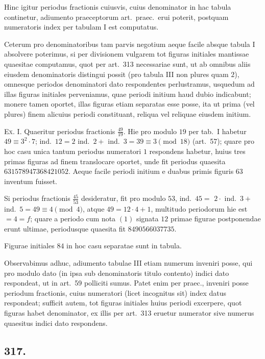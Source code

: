 \documentclass[12pt,a4paper]{article}
\theoremstyle{plain}
\theoremstyle{definition}
\theoremstyle{remark}
\begin{document}
Hinc igitur periodus fractionis cuiusvis, cuius denominator in hac tabula
continetur, adiumento praeceptorum art.\ praec.\ erui poterit, postquam numeratoris
index per tabulam I est computatus.

Ceterum pro denominatoribus tam parvis negotium aeque facile absque
tabula I absolvere poterimus, si per divisionem vulgarem tot figuras initiales
mantissae quaesitae computamus, quot per art.\@~313 necessariae sunt, ut ab
omnibus aliis eiusdem denominatoris distingui possit (pro tabula III non plures
quam $2$), omnesque periodos denominatori dato respondentes perlustramus,
usquedum ad illas figuras initiales perveniamus, quae periodi initium haud dubio
indicabunt; monere tamen oportet, illas figuras etiam separatas esse posse, ita
ut prima (vel plures) finem alicuius periodi constituant, reliqua vel reliquae
eiusdem initium.

\textsc{Ex. I.} Quaeritur periodus fractionis $\tfrac{49}{19}$. Hie pro modulo $19$ per tab.\ I
habetur $49 \equiv 3^2 \cdot 7$; ind.\ $12 = 2$ ind.\ $2 + $ ind.\ $3 = 39 \equiv 3 \pmod{18}$
(art.\@~57); quare pro hoc casu unica tantum periodus numeratori $1$
respondens habetur, huius tres primas figuras ad finem translocare oportet,
unde fit periodus quaesita $631578947368421052$.
Aeque facile periodi initium e duabus primis figuris $63$ inventum fuisset.

Si periodus fractionis $\tfrac{45}{53}$ desideratur, fit pro modulo $53$, ind.\ $45 = $
$2 \cdot $ ind.\ $3 + $ ind.\ $5 = 49 \equiv 4 \pmod{4}$, atque $49 = 12 \cdot 4 + 1$,
multitudo periodorum hie est $= 4 = f$; quare a periodo cum nota $(1)$
signata $12$ primae figurae postponendae erunt ultimae, periodusque quaesita fit
$8490566037735$.

Figurae initiales $84$ in hoc casu separatae sunt in tabula.

Observabimus adhuc, adiumento tabulae III etiam numerum inveniri posse,
qui pro modulo dato (in ipsa sub denominatoris titulo contento) indici dato
respondeat, ut in art.\@~59 polliciti sumus. Patet enim per praec., inveniri
posse periodum fractionis, cuius numeratori (licet incognitus sit) index datus
respondeat; sufficit autem, tot figuras initiales huius periodi excerpere, quot
figuras habet denominator, ex illis per art.\@~313 eruetur numerator sive numerus
quaesitus indici dato respondens.

\subsection*{317.}
\end{document}
